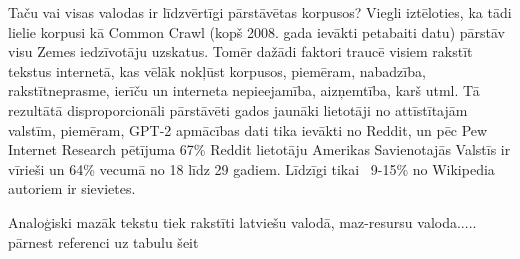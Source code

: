
Taču vai visas valodas ir līdzvērtīgi pārstāvētas korpusos? Viegli iztēloties, ka tādi lielie korpusi kā Common Crawl (kopš 2008. gada ievākti petabaiti datu) pārstāv visu Zemes iedzīvotāju uzskatus. Tomēr dažādi faktori traucē visiem rakstīt tekstus internetā, kas vēlāk nokļūst korpusos, piemēram, nabadzība, rakstītneprasme, ierīču un interneta nepieejamība, aizņemtība, karš utml. Tā rezultātā disproporcionāli pārstāvēti gados jaunāki lietotāji no attīstītajām valstīm, piemēram, GPT-2 apmācības dati tika ievākti no Reddit, un pēc Pew Internet Research pētījuma 67\% Reddit lietotāju Amerikas Savienotajās Valstīs ir vīrieši un 64\% vecumā no 18 līdz 29 gadiem. Līdzīgi tikai ~9-15\% no Wikipedia autoriem ir sievietes\cite{bender2021}.

Analoģiski mazāk tekstu tiek rakstīti latviešu valodā, maz-resursu valoda..... pārnest referenci uz tabulu šeit